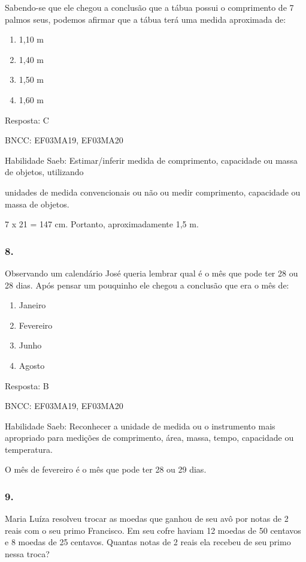 Sabendo-se que ele chegou a conclusão que a tábua possui o comprimento
de 7 palmos seus, podemos afirmar que a tábua terá uma medida aproximada
de:

\begin{enumerate}
\def\labelenumi{\alph{enumi})}
\item
  1,10 m
\item
  1,40 m
\item
  1,50 m
\item
  1,60 m
\end{enumerate}

Resposta: C

BNCC: EF03MA19, EF03MA20

Habilidade Saeb: Estimar/inferir medida de comprimento, capacidade ou
massa de objetos, utilizando

unidades de medida convencionais ou não ou medir comprimento, capacidade
ou massa de objetos.

7 x 21 = 147 cm. Portanto, aproximadamente 1,5 m.

\subsubsection{8.}\label{section-148}

Observando um calendário José queria lembrar qual é o mês que pode ter
28 ou 28 dias. Após pensar um pouquinho ele chegou a conclusão que era o
mês de:

\begin{enumerate}
\def\labelenumi{\alph{enumi})}
\item
  Janeiro
\item
  Fevereiro
\item
  Junho
\item
  Agosto
\end{enumerate}

Resposta: B

BNCC: EF03MA19, EF03MA20

Habilidade Saeb: Reconhecer a unidade de medida ou o instrumento mais
apropriado para medições de comprimento, área, massa, tempo, capacidade
ou temperatura.

O mês de fevereiro é o mês que pode ter 28 ou 29 dias.

\subsubsection{9.}\label{section-149}

Maria Luíza resolveu trocar as moedas que ganhou de seu avô por notas de
2 reais com o seu primo Francisco. Em seu cofre haviam 12 moedas de 50
centavos e 8 moedas de 25 centavos. Quantas notas de 2 reais ela recebeu
de seu primo nessa troca?

